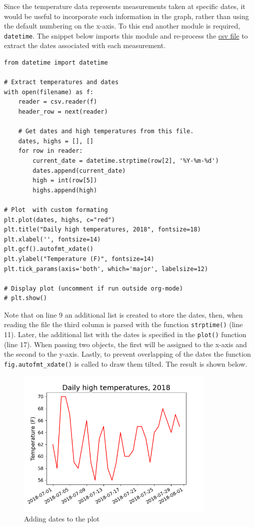 \documentclass[10pt]{book}
\begin{document}
Since the temperature data represents measurements taken at specific dates, it would be useful to incorporate such information in the graph, rather than using the default numbering on the x-axis. To this end another module is required, \texttt{datetime}. The snippet below imports this module and re-process the \hyperref[orgb64852b]{csv file} to extract the dates associated with each measurement.

\label{org0f76339}
\begin{verbatim}
from datetime import datetime

# Extract temperatures and dates
with open(filename) as f:
    reader = csv.reader(f)
    header_row = next(reader)

    # Get dates and high temperatures from this file.
    dates, highs = [], []
    for row in reader:
        current_date = datetime.strptime(row[2], '%Y-%m-%d')
        dates.append(current_date)
        high = int(row[5])
        highs.append(high)

# Plot  with custom formating
plt.plot(dates, highs, c="red")
plt.title("Daily high temperatures, 2018", fontsize=18)
plt.xlabel('', fontsize=14)
plt.gcf().autofmt_xdate()
plt.ylabel("Temperature (F)", fontsize=14)
plt.tick_params(axis='both', which='major', labelsize=12)

# Display plot (uncomment if run outside org-mode)
# plt.show()
\end{verbatim}

Note that on line  9 an additional list is created to store the dates, then, when reading the file the third column is parsed with the function \texttt{strptime()} (line 11). Later, the additional list with the dates is specified in the \texttt{plot()} function (line 17). When passing two objects, the first will be assigned to the x-axis and the second to the y-axis. Lastly, to prevent overlapping of the dates the function \texttt{fig.autofmt\_xdate()} is called to draw them tilted. The result is shown below.

\begin{figure}[!ht]
\centering
\includegraphics[width=0.85\textwidth]{output/images/High_temp3.png}
\caption{\label{fig:org4b06aac}Adding dates to the plot}
\end{figure}
\end{document}
